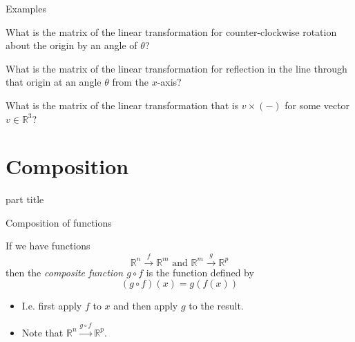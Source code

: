 \documentclass{beamer}
\begin{document}
\begin{frame}{Examples}
\begin{example}
What is the matrix of the linear transformation for counter-clockwise rotation about the origin by an angle of $\theta$?
\end{example}
\begin{example}
What is the matrix of the linear transformation for reflection in the line through that origin at an angle $\theta$ from the $x$-axis?
\end{example}
\begin{example}
What is the matrix of the linear transformation that is $v\times (-)$ for some vector $v\in \mathbb{R}^3$?
\end{example}
\end{frame}

\section{Composition}

\begin{frame}
\begin{beamercolorbox}[sep=12pt,center]{part title}
\insertsection\par
\end{beamercolorbox}
\end{frame}

\begin{frame}{Composition of functions}
\begin{definition}
If we have functions
\begin{equation*}
\mathbb{R}^n \xrightarrow{f} \mathbb{R}^m \text{ and }\mathbb{R}^m \xrightarrow{g} \mathbb{R}^p
\end{equation*}
then the \emph{composite function $g\circ f$} is the function defined by
\begin{equation*}
(g\circ f)(x) = g(f(x))
\end{equation*}
\end{definition}
\begin{itemize}
	\item I.e. first apply $f$ to $x$ and then apply $g$ to the result.
	\item Note that $\mathbb{R}^n \xrightarrow{g\circ f} \mathbb{R}^p$.
\end{itemize}
\end{frame}
\end{document}
